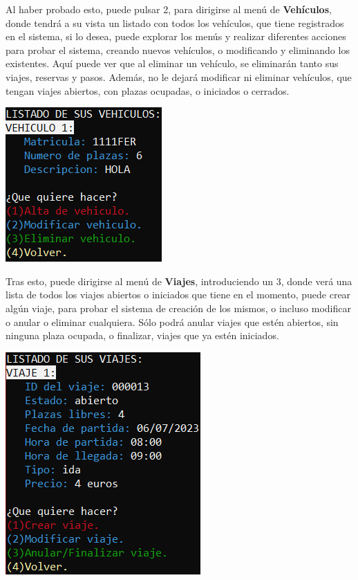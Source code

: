 Al haber probado esto, puede pulsar 2, para dirigirse al menú de \textbf{Vehículos}, donde tendrá a su vista un listado con todos los vehículos, que tiene registrados en el sistema, si lo desea,
puede explorar los menús y realizar diferentes acciones para probar el sistema, creando nuevos vehículos, o modificando y eliminando los existentes. Aquí puede ver que al eliminar un vehículo,
se eliminarán tanto sus viajes, reservas y pasos. Además, no le dejará modificar ni eliminar vehículos, que tengan viajes abiertos, con plazas ocupadas, o iniciados o cerrados.
\begin{center}
  \includegraphics[]{FOTOS/menuConductorVehiculo.png}
\end{center}
Tras esto, puede dirigirse al menú de \textbf{Viajes}, introduciendo un 3, donde verá una lista de todos los viajes abiertos o iniciados que tiene en el momento, puede crear algún viaje,
para probar el sistema de creación de los mismos, o incluso modificar o anular o eliminar cualquiera. Sólo podrá anular viajes que estén abiertos, sin ninguna plaza ocupada, o finalizar,
viajes que ya estén iniciados.
\begin{center}
  \includegraphics[]{FOTOS/menuConductorViaje.png}
\end{center}

